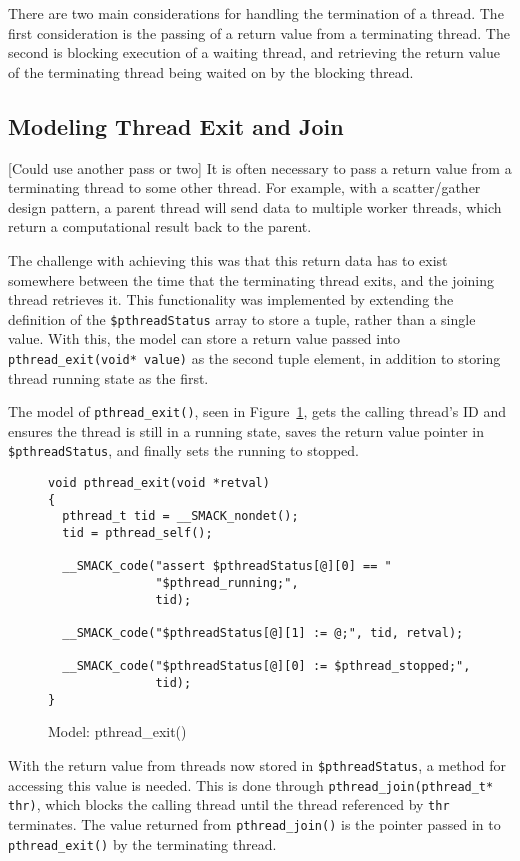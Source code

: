 There are two main considerations for handling the termination of a
thread.  The first consideration is the passing of a return value from
a terminating thread.  The second is blocking execution of a waiting
thread, and retrieving the return value of the terminating thread
being waited on by the blocking thread.

\subsection{Modeling Thread Exit and Join}
[Could use another pass or two]
It is often necessary to pass a return value from a terminating thread
to some other thread.  For example, with a scatter/gather design
pattern, a parent thread will send data to multiple worker threads,
which return a computational result back to the parent.

The challenge with achieving this was that this return data has to
exist somewhere between the time that the terminating thread exits,
and the joining thread retrieves it.  This functionality was
implemented by extending the definition of the
\lstinline|$pthreadStatus| array to store a tuple, rather than a 
single value.  With this, the model can store a return value passed
into \lstinline|pthread_exit(void* value)| as the second tuple
element, in addition to storing thread running state as the first.

The model of \lstinline|pthread_exit()|, seen in
Figure~\ref{fig:pthread_exit}, gets the calling thread's ID and
ensures the thread is still in a running state, saves the return value
pointer in \lstinline|$pthreadStatus|, and finally sets the running to
stopped.  

\begin{figure}[h]
\centering
\caption{Model: pthread\_exit()}\label{fig:pthread_exit}
\begin{lstlisting}
void pthread_exit(void *retval)
{
  pthread_t tid = __SMACK_nondet();
  tid = pthread_self();

  __SMACK_code("assert $pthreadStatus[@][0] == "
               "$pthread_running;",
               tid);

  __SMACK_code("$pthreadStatus[@][1] := @;", tid, retval);

  __SMACK_code("$pthreadStatus[@][0] := $pthread_stopped;",
               tid);
}
\end{lstlisting}
\end{figure}

With the return value from threads now stored in
\lstinline|$pthreadStatus|, a method for accessing this value is
needed.  This is done through 
\lstinline|pthread_join(pthread_t* thr)|, which blocks the calling
thread until the thread referenced  by \lstinline|thr| terminates.
The value returned from \lstinline|pthread_join()| is the pointer
passed in to \lstinline|pthread_exit()| by the terminating thread.

